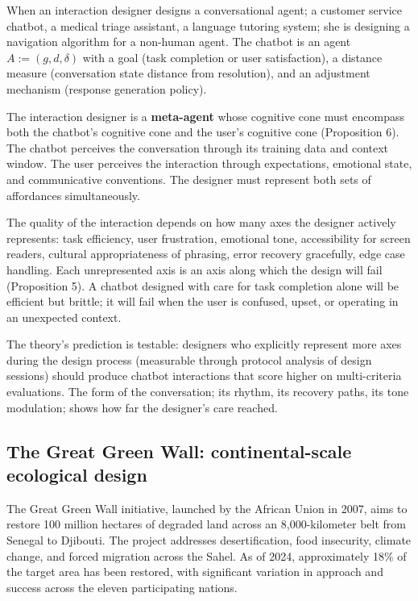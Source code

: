 When an interaction designer designs a conversational agent; a customer service chatbot, a medical triage assistant, a language tutoring system; she is designing a navigation algorithm for a non-human agent. The chatbot is an agent $A := (g, d, \delta)$ with a goal (task completion or user satisfaction), a distance measure (conversation state distance from resolution), and an adjustment mechanism (response generation policy).

The interaction designer is a \textbf{meta-agent} whose cognitive cone must encompass both the chatbot's cognitive cone and the user's cognitive cone (Proposition 6). The chatbot perceives the conversation through its training data and context window. The user perceives the interaction through expectations, emotional state, and communicative conventions. The designer must represent both sets of affordances simultaneously.

The quality of the interaction depends on how many axes the designer actively represents: task efficiency, user frustration, emotional tone, accessibility for screen readers, cultural appropriateness of phrasing, error recovery gracefully, edge case handling. Each unrepresented axis is an axis along which the design will fail (Proposition 5). A chatbot designed with care for task completion alone will be efficient but brittle; it will fail when the user is confused, upset, or operating in an unexpected context.

The theory's prediction is testable: designers who explicitly represent more axes during the design process (measurable through protocol analysis of design sessions) should produce chatbot interactions that score higher on multi-criteria evaluations. The form of the conversation; its rhythm, its recovery paths, its tone modulation; shows how far the designer's care reached.

\subsection{The Great Green Wall: continental-scale ecological design}

The Great Green Wall initiative, launched by the African Union in 2007, aims to restore 100 million hectares of degraded land across an 8,000-kilometer belt from Senegal to Djibouti. The project addresses desertification, food insecurity, climate change, and forced migration across the Sahel. As of 2024, approximately 18\% of the target area has been restored, with significant variation in approach and success across the eleven participating nations.

